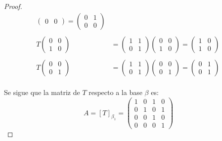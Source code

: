 \documentclass[11pt]{article}
\begin{document}
\begin{proof}
\begin{align*}
\begin{pmatrix}
            0&0
        \end{pmatrix}=\begin{pmatrix}
            0&1\\
            0&0
        \end{pmatrix}\\
        \,\\
        T\begin{pmatrix}
            0&0\\
            1&0
        \end{pmatrix}&=\begin{pmatrix}
            1&1\\
            0&1
        \end{pmatrix}\begin{pmatrix}
            0&0\\
            1&0
        \end{pmatrix}=\begin{pmatrix}
            1&0\\
            1&0
        \end{pmatrix}\,\\
        \,\\
           T\begin{pmatrix}
            0&0\\
            0&1
        \end{pmatrix}&=\begin{pmatrix}
            1&1\\
            0&1
        \end{pmatrix}\begin{pmatrix}
            0&0\\
            0&1
        \end{pmatrix}=\begin{pmatrix}
            0&1\\
            0&1
        \end{pmatrix}
    \end{align*}\,\\
    Se sigue que la matriz de $T$ respecto a la base $\beta$ es:\,\\
    \begin{equation*}
      A=[T]_{\beta_1}=\begin{pmatrix}
        1&0&1&0\\
        0&1&0&1\\
        0&0&1&0\\
        0&0&0&1
        \end{pmatrix}

\end{equation*}
\end{proof}
\end{document}
